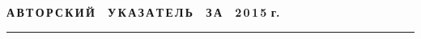 
\def\stat{cont}
{%
\raggedleft\Large \bf%
А\,В\,Т\,О\,Р\,С\,К\,И\,Й\ \ У\,К\,А\,З\,А\,Т\,Е\,Л\,Ь\ \ З\,А\ \ 2\,0\,1\,5 г. \vskip 17pt
    \hrule
    \par
{} }

\label{st\stat}

\def\tit{\ }

\def\aut{\ }
\def\auf{\ }

\def\leftkol{\ } %

\def\rightkol{\ } %

\titele{\tit}{\aut}{\auf}{\leftkol}{\rightkol}

\vspace*{-12pt}
\vspace*{-18pt}

